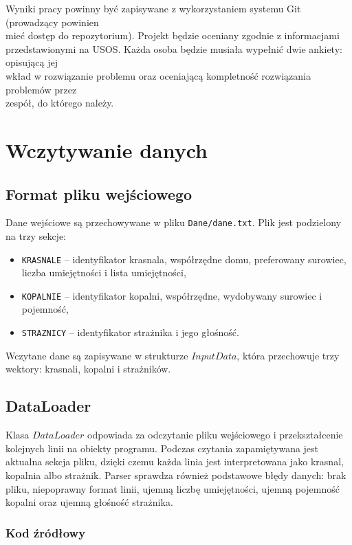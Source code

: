 \documentclass{article}
\begin{document}
Wyniki pracy powinny być zapisywane z wykorzystaniem systemu Git (prowadzący powinien \\ mieć dostęp do repozytorium). Projekt będzie oceniany zgodnie z informacjami \\ przedstawionymi na USOS. Każda osoba będzie musiała wypełnić dwie ankiety: opisującą jej \\ wkład w rozwiązanie problemu oraz oceniającą kompletność rozwiązania problemów przez \\ zespół, do którego należy.

\section{Wczytywanie danych}

\subsection{Format pliku wejściowego}
Dane wejściowe są przechowywane w pliku \texttt{Dane/dane.txt}. Plik jest podzielony na trzy sekcje:
\begin{itemize}
    \item \texttt{KRASNALE} -- identyfikator krasnala, współrzędne domu, preferowany surowiec, liczba umiejętności i lista umiejętności,
    \item \texttt{KOPALNIE} -- identyfikator kopalni, współrzędne, wydobywany surowiec i pojemność,
    \item \texttt{STRAZNICY} -- identyfikator strażnika i jego głośność.
\end{itemize}
Wczytane dane są zapisywane w strukturze $InputData$, która przechowuje trzy wektory: krasnali, kopalni i strażników.

\subsection{DataLoader}
Klasa $DataLoader$ odpowiada za odczytanie pliku wejściowego i przekształcenie kolejnych linii na obiekty programu. Podczas czytania zapamiętywana jest aktualna sekcja pliku, dzięki czemu każda linia jest interpretowana jako krasnal, kopalnia albo strażnik.
Parser sprawdza również podstawowe błędy danych: brak pliku, niepoprawny format linii, ujemną liczbę umiejętności, ujemną pojemność kopalni oraz ujemną głośność strażnika.

\subsubsection{Kod źródłowy}



\end{document}
